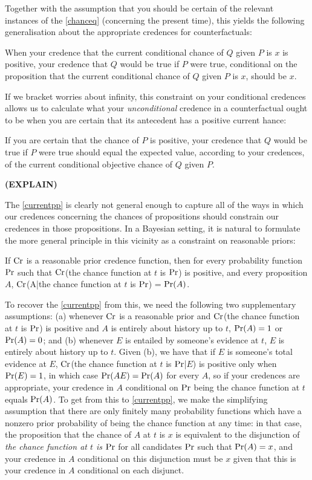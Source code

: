 \documentclass[If.tex]{subfiles}
\begin{document}
Together with the assumption that you should be certain of the relevant
instances of the \ref{chanceq} (concerning the present time), this
yields the following generalisation about the appropriate credences for
counterfactuals:
\begin{prop}
	 \label{currentskyrms}
	When your credence that the current conditional chance of $Q$ given $P$ is $x$ is positive, your credence that $Q$ would be true if $P$ were true, conditional on the proposition that the current conditional chance of $Q$ given $P$ is $x$, should be $x$. 
\end{prop}
If we bracket worries about infinity, this constraint on your
conditional credences allows us to calculate what your
\emph{unconditional} credence in a counterfactual ought to be when you are certain that its antecedent has a positive current hance:
\begin{prop}
	\item
	If you are certain that the chance of $P$ is positive, your credence that $Q$ would be true if $P$ were true should equal the expected value, according to your credences, of the current conditional objective chance of $Q$ given $P$.
\end{prop}
\textbf{(EXPLAIN)}

The \ref{currentpp} is clearly not general enough to capture all of the ways in which our credences concerning the chances of propositions should constrain our credences in those propositions.  In a Bayesian setting, it is natural to formulate the more general principle in this vicinity as a constraint on reasonable priors:  
\begin{prop}
	 \label{pp}
	If $\operatorname{Cr}$ is a reasonable prior credence function, then for every probability function $\operatorname{Pr}$ such that $\operatorname{Cr}$(the chance function at $t$ is $\operatorname{Pr}$) is positive, and every proposition $A$, $\operatorname{Cr}$(A|the chance function at $t$ is $\operatorname{Pr}$) = $\operatorname{Pr}(A)$.  
\end{prop}
To recover the \ref{currentpp} from this, we need the following two supplementary assumptions: (a) whenever $\operatorname{Cr}$ is a reasonable prior and $\operatorname{Cr}$(the chance function at $t$ is $\operatorname{Pr}$) is positive and $A$ is entirely about history up to $t$, $\operatorname{Pr}(A) = 1$ or $\operatorname{Pr}(A) = 0$; and (b) whenever $E$ is entailed by someone's evidence at $t$, $E$ is entirely about history up to $t$.  Given (b), we have that if $E$ is someone's total evidence at $E$, $\operatorname{Cr}$(the chance function at $t$ is $\operatorname{Pr}$|$E$) is positive only when $\operatorname{Pr}(E) = 1$, in which case $\operatorname{Pr}(AE) = \operatorname{Pr}(A)$ for every $A$, so if your credences are appropriate, your credence in $A$ conditional on $\operatorname{Pr}$ being the chance function at $t$ equals $\operatorname{Pr}(A)$. To get from this to \ref{currentpp}, we make the simplifying assumption that there are only finitely many probability functions which have a nonzero prior probability of being the chance function at any time: in that case, the proposition that the chance of $A$ at $t$ is $x$ is equivalent to the disjunction of \emph{the chance function at $t$ is $\operatorname{Pr}$} for all candidates $\operatorname{Pr}$ such that $\operatorname{Pr}(A) = x$, and your credence in $A$ conditional on this disjunction must be $x$ given that this is your credence in $A$ conditional on each disjunct.  
\end{document}
